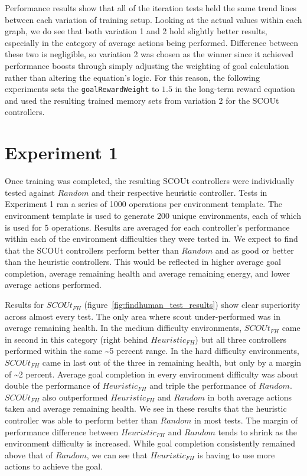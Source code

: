 Performance results show that all of the iteration tests held the same trend lines between each variation of training setup.
Looking at the actual values within each graph, we do see that both variation 1 and 2 hold slightly better results, especially in the category of average actions being performed.
Difference between these two is negligible, so variation 2 was chosen as the winner since it achieved performance boosts through simply adjusting the weighting of goal calculation rather than altering the equation's logic.
For this reason, the following experiments sets the \texttt{goalRewardWeight} to $1.5$ in the long-term reward equation and used the resulting trained memory sets from variation 2 for the SCOUt controllers.



\section{Experiment 1} \label{sec:experiment1}
Once training was completed, the resulting SCOUt controllers were individually tested against $Random$ and their respective heuristic controller.
Tests in Experiment 1 ran a series of 1000 operations per environment template.
The environment template is used to generate 200 unique environments, each of which is used for 5 operations.
Results are averaged for each controller's performance within each of the environment difficulties they were tested in.
We expect to find that the SCOUt controllers perform better than $Random$ and as good or better than the heuristic controllers.
This would be reflected in higher average goal completion, average remaining health and average remaining energy, and lower average actions performed.

Results for $SCOUt_{FH}$ (figure~\ref{fig:findhuman_test_results}) show clear superiority across almost every test.
The only area where scout under-performed was in average remaining health.
In the medium difficulty environments, $SCOUt_{FH}$ came in second in this category (right behind $Heuristic_{FH}$) but all three controllers performed within the same \textasciitilde5 percent range.
In the hard difficulty environments, $SCOUt_{FH}$ came in last out of the three in remaining health, but only by a margin of \textasciitilde2 percent.
Average goal completion in every environment difficulty was about double the performance of $Heuristic_{FH}$ and triple the performance of $Random$.
$SCOUt_{FH}$ also outperformed $Heuristic_{FH}$ and $Random$ in both average actions taken and average remaining health.
We see in these results that the heuristic controller was able to perform better than $Random$ in most tests.
The margin of performance difference between $Heuristic_{FH}$ and $Random$ tends to shrink as the environment difficulty is increased.
While goal completion consistently remained above that of $Random$, we can see that $Heuristic_{FH}$ is having to use more actions to achieve the goal.

